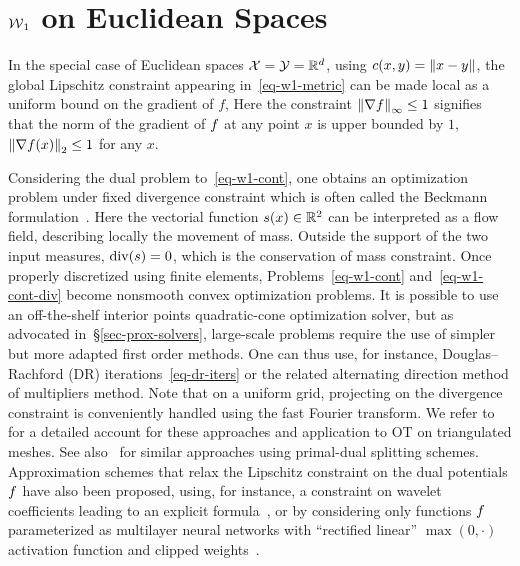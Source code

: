 \section{$\operatorname{\mathcal{W}}_1$ on Euclidean Spaces}
\label{sec-w1-eucl}


In the special case of Euclidean spaces $\mathcal{X}=\mathcal{Y}=\mathbb{R}^d$, using $c(x,y) = \left\| x-y \right\|$, the global Lipschitz constraint appearing in~\eqref{eq-w1-metric} can be made local as a uniform bound on the gradient of $f$, 
Here the constraint $\left\| \nabla f \right\|_\infty \leq 1$ signifies that the norm of the gradient of $f$ at any point $x$ is upper bounded by $1$, $\left\| \nabla f(x) \right\|_2 \leq 1$ for any $x$.

Considering the dual problem to~\eqref{eq-w1-cont}, one obtains an optimization problem under fixed divergence constraint
which is often called the Beckmann formulation~\citep{Beckmann52}.
%
Here the vectorial function $s(x) \in \mathbb{R}^2$ can be interpreted as a flow field, describing locally the movement of mass. Outside the support of the two input measures, $\operatorname{div}(s)=0$, which is the conservation of mass constraint. 
%
Once properly discretized using finite elements, Problems~\eqref{eq-w1-cont} and~\eqref{eq-w1-cont-div} become nonsmooth convex optimization problems. 
%
It is possible to use an off-the-shelf interior points quadratic-cone optimization solver, but as advocated in~\S\ref{sec-prox-solvers}, large-scale problems require the use of simpler but more adapted first order methods. One can thus use, for instance, Douglas--Rachford (DR) iterations~\eqref{eq-dr-iters} or the related alternating direction method of multipliers method. Note that on a uniform grid, projecting on the divergence constraint is conveniently handled using the fast Fourier transform. We refer to~\citet{SolomonEMDSurfaces2014} for a detailed account for these approaches and application to OT on triangulated meshes.
%
See also~\citet{LiRyuOsherYinGangbo2017_parallel,Ryu2017a,Ryu2017b} for similar approaches using primal-dual splitting schemes.
%
Approximation schemes that relax the Lipschitz constraint on the dual potentials $f$ have also been proposed, using, for instance, a constraint on wavelet coefficients leading to an explicit formula~\citep{shirdhonkar2008approximate}, or by considering only functions $f$ parameterized as multilayer neural networks with ``rectified linear'' $\max(0,\cdot)$ activation function and clipped weights~\citep{WassersteinGAN}.

